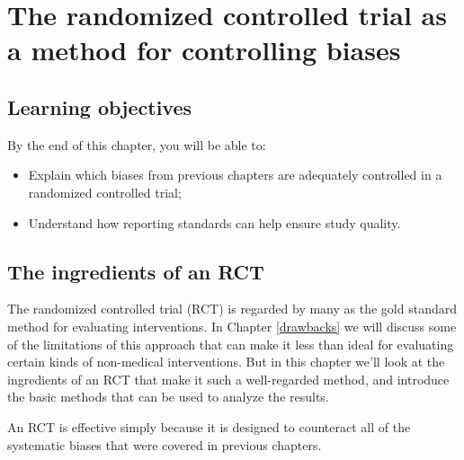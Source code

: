 \documentclass{krantz}
\begin{document}
\hypertarget{RCT}{%
\chapter{The randomized controlled trial as a method for controlling biases}\label{RCT}}

\hypertarget{learning-objective-s}{%
\section{Learning objectives}\label{learning-objective-s}}

By the end of this chapter, you will be able to:
\begin{itemize}
\item
 Explain which biases from previous chapters are adequately controlled in a randomized controlled trial;
\item
 Understand how reporting standards can help ensure study quality.
 \end{itemize}

\hypertarget{the-ingredients-of-a-rct}{%
\section{The ingredients of an RCT}\label{the-ingredients-of-a-rct}}

The randomized controlled trial (RCT) is regarded by many as the gold standard method for evaluating interventions. In Chapter \ref{drawbacks} we will discuss some of the limitations of this approach that can make it less than ideal for evaluating certain kinds of non-medical interventions. But in this chapter we'll look at the ingredients of an RCT that make it such a well-regarded method, and introduce the basic methods that can be used to analyze the results.

An RCT is effective simply because it is designed to counteract all of the systematic biases that were covered in previous chapters.
\end{document}
